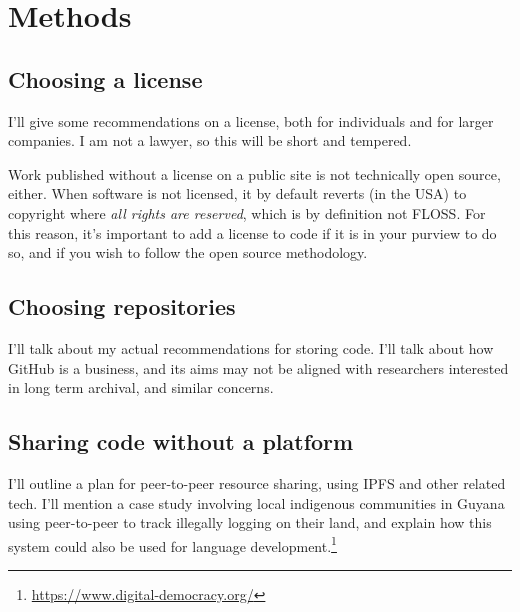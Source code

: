 \section{Methods}
\label{sec:methods}

\subsection{Choosing a license}
\label{choosing-a-license}

I'll give some recommendations on a license, both for individuals and for larger companies. I am not a lawyer, so this will be short and tempered.


Work published without a license on a public site is not technically open source, either. When software is not licensed, it by default reverts (in the USA) to copyright where {\it all rights are reserved}, which is by definition not FLOSS. For this reason, it's important to add a license to code if it is in your purview to do so, and if you wish to follow the open source methodology. %

\subsection{Choosing repositories}
\label{choosing-repositories}

I'll talk about my actual recommendations for storing code. I'll talk about how GitHub is a business, and its aims may not be aligned with researchers interested in long term archival, and similar concerns.


\subsection{Sharing code without a platform}
\label{subsec:sharing-code-without-a-platform}

I'll outline a plan for peer-to-peer resource sharing, using IPFS \citep{benet2014ipfs} and other related tech. I'll mention a case study involving local indigenous communities in Guyana using peer-to-peer to track illegally logging on their land, and explain how this system could also be used for language development.\footnote{\href{https://www.digital-democracy.org/}{https://www.digital-democracy.org/}}
